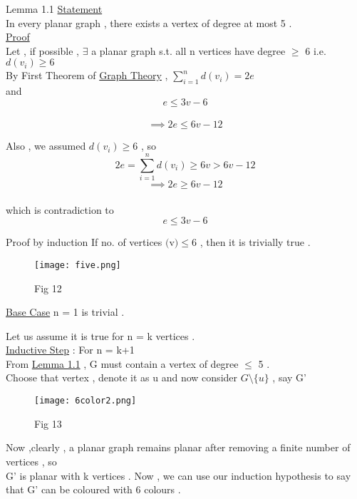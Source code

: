 \documentclass[12pt]{beamer}
\begin{document}
\begin{frame}{Lemma 1.1}
\underline {\large{Statement}}  \\
In every planar graph , there exists a vertex of degree at most 5 .\\
\underline {\large{Proof}}\\
Let , if possible , $\exists$ a planar graph s.t. all n vertices have degree $\geq$ 6 i.e. $d(v_i) \geq 6$ \\
By First Theorem of \hyperlink{page.27}{Graph Theory} , $\sum_{i=1}^{n} d(v_i) = 2e$\\
and $$e \leq 3v-6 $$ \\
$$\implies  2e \leq 6v-12$$  
\end{frame}

\begin{frame}
Also , we assumed $d(v_i) \geq 6$ , so \\
$$ 2e =  \sum_{i=1}^{n} d(v_i) \geq 6v  > 6v - 12$$
$$\implies 2e \geq 6v-12 $$ \\
which is contradiction to  $$e \leq 3v-6 $$
\end{frame}

\begin{frame}{Proof by induction}
If no. of vertices $($v$)\leq 6$ , then it is trivially true . \\
\begin{figure}
\texttt{[image: five.png]}
\caption{Fig 12}
\end{figure}
\end{frame}

\begin{frame}
\underline {\large{Base Case}} n = 1 is trivial .

Let us assume it is true for n = k vertices .\\
\underline {\large{Inductive Step}} : For n = k+1 \\
From \hyperlink{page.24}{Lemma 1.1} , G must contain a vertex of degree $\leq$ 5 . \\
Choose that vertex , denote it as u and now consider $G \setminus \{u\}$ , say G'\\
\begin{figure}
\texttt{[image: 6color2.png]}
\caption{Fig 13}
\end{figure}
\end{frame}

\begin{frame}
Now ,clearly , a planar graph remains planar after removing a finite number of vertices , so \\
 G' is planar with k vertices . Now , we can use our induction hypothesis to say that G' can be coloured with 6 colours .\\
\end{frame}
\end{document}
